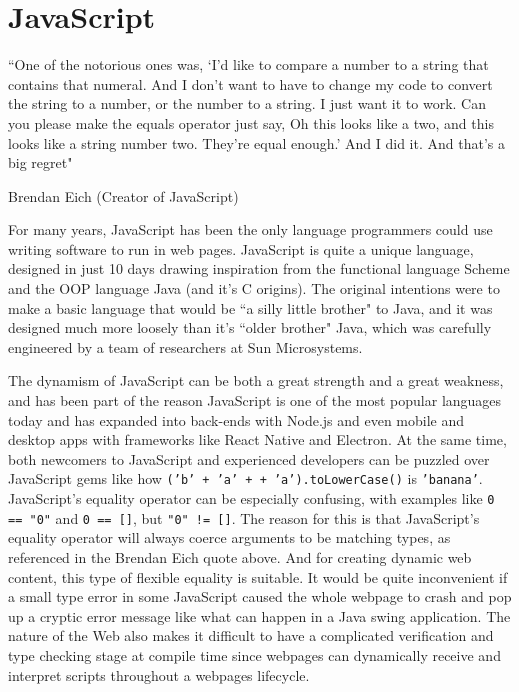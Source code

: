 \documentclass[12pt,a4paper,twoside,openright]{report}
\begin{document}
\section{JavaScript}

\epigraph{“One of the notorious ones was, ‘I’d like to compare a number to a string that contains that numeral. And I don’t want to have to change my code to convert the string to a number, or the number to a string. I just want it to work. Can you please make the equals operator just say, Oh this looks like a two, and this looks like a string number two. They’re equal enough.’ And I did it. And that’s a big regret" \cite{jsorigins}}{Brendan Eich (Creator of JavaScript)}

For many years, JavaScript has been the only language programmers could use writing software to run in web pages.
JavaScript is quite a unique language, designed in just 10 days drawing inspiration from the functional language Scheme and the OOP language Java (and it's C origins).
The original intentions were to make a basic language that would be ``a silly little brother"\cite{jsorigins} to Java, and it was designed much more loosely than it's ``older brother" Java, which was carefully engineered by a team of researchers at Sun Microsystems.

The dynamism of JavaScript can be both a great strength and a great weakness, and has been part of the reason JavaScript is one of the most popular languages today and has expanded into back-ends with Node.js and even mobile and desktop apps with frameworks like React Native and Electron.
At the same time, both newcomers to JavaScript and experienced developers can be puzzled over JavaScript gems like how \mbox{\tt ('b' + 'a' + + 'a').toLowerCase()} is {\tt 'banana'}.
JavaScript's equality operator can be especially confusing, with examples like {\tt 0 == "0"} and {\tt 0 == []}, but {\tt "0" != []}.
The reason for this is that JavaScript's equality operator will always coerce arguments to be matching types, as referenced in the Brendan Eich quote above.
And for creating dynamic web content, this type of flexible equality is suitable.
It would be quite inconvenient if a small type error in some JavaScript caused the whole webpage to crash and pop up a cryptic error message like what can happen in a Java swing application.
The nature of the Web also makes it difficult to have a complicated verification and type checking stage at compile time since webpages can dynamically receive and interpret scripts throughout a webpages lifecycle.
\end{document}
